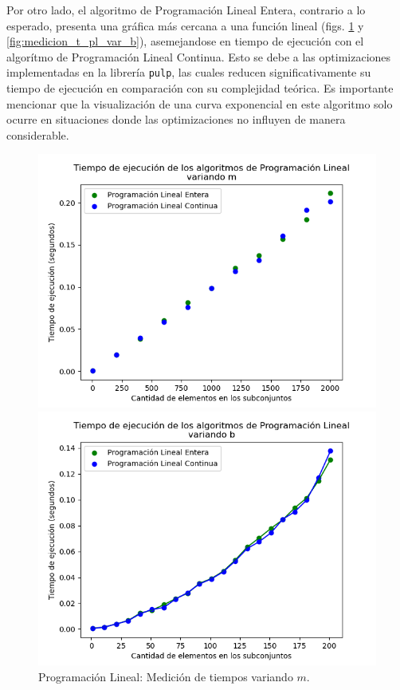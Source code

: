 Por otro lado, el algoritmo de Programación Lineal Entera, contrario a lo esperado, presenta una gráfica más cercana a una función lineal (figs. \ref{fig:medicion_t_pl_var_m} y \ref{fig:medicion_t_pl_var_b}), asemejandose en tiempo de ejecución con el algorítmo de Programación Lineal Continua. Esto se debe a las optimizaciones implementadas en la librería \texttt{pulp}, las cuales reducen significativamente su tiempo de ejecución en comparación con su complejidad teórica. Es importante mencionar que la visualización de una curva exponencial en este algoritmo solo ocurre en situaciones donde las optimizaciones no influyen de manera considerable.

\begin{figure}[h]
    \centering
    \begin{minipage}{0.45\textwidth}
        \centering
        \includegraphics[width=\textwidth]{img/medicion_t_pl_var_m.png}
        \caption{Programación Lineal: Medición de tiempos variando $m$.}
        \label{fig:medicion_t_pl_var_m}
    \end{minipage}\hfill
    \begin{minipage}{0.45\textwidth}
        \centering
        \includegraphics[width=\textwidth]{img/medicion_t_pl_var_b.png}

\end{minipage}
\end{figure}
